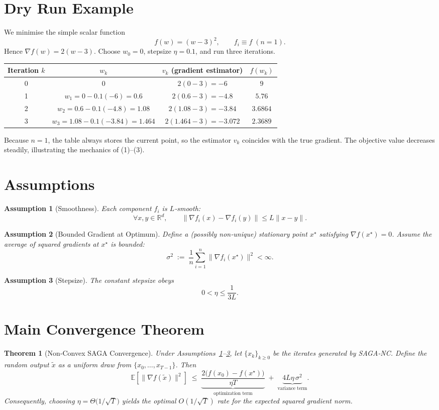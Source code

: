 \documentclass{article}
\newtheorem{theorem}{Theorem}
\newtheorem{assumption}{Assumption}
\newcommand{\E}{\mathbb{E}}
\newcommand{\R}{\mathbb{R}}
\begin{document}
\section*{Dry Run Example}
We minimise the simple scalar function 
\[
f(w)=(w-3)^2,\qquad f_i\equiv f\;(n=1).
\]
Hence $\nabla f(w)=2(w-3)$.  Choose $w_0=0$, stepsize $\eta=0.1$, and run three iterations.

\begin{center}
\begin{tabular}{c|c|c|c}
Iteration $k$ & $w_k$ & $v_k$ (gradient estimator) & $f(w_k)$\\\hline
0 & $0$ & $2(0-3)=-6$ & $9$\\
1 & $w_1=0-0.1(-6)=0.6$ & $2(0.6-3)=-4.8$ & $5.76$\\
2 & $w_2=0.6-0.1(-4.8)=1.08$ & $2(1.08-3)=-3.84$ & $3.6864$\\
3 & $w_3=1.08-0.1(-3.84)=1.464$ & $2(1.464-3)=-3.072$ & $2.3689$
\end{tabular}
\end{center}
Because $n=1$, the table always stores the current point, so the estimator $v_k$ coincides with the true gradient.  The objective value decreases steadily, illustrating the mechanics of (1)–(3).

\newpage
\section*{Assumptions}
\begin{assumption}[Smoothness]\label{as:smooth}
Each component $f_i$ is $L$‑smooth:
\[
\forall x,y\in\R^{d},\qquad 
\|\nabla f_i(x)-\nabla f_i(y)\|\le L\|x-y\|.
\]
\end{assumption}
\begin{assumption}[Bounded Gradient at Optimum]\label{as:bounded}
Define a (possibly non‑unique) stationary point $x^{\star}$ satisfying $\nabla f(x^{\star})=0$.  
Assume the average of squared gradients at $x^{\star}$ is bounded:
\[
\sigma^{2}\;:=\;\frac1n\sum_{i=1}^{n}\|\nabla f_i(x^{\star})\|^{2}<\infty .
\]
\end{assumption}
\begin{assumption}[Stepsize]\label{as:stepsize}
The constant stepsize obeys 
\[
0<\eta\le\frac{1}{3L}.
\]
\end{assumption}

\section*{Main Convergence Theorem}
\begin{theorem}[Non‑Convex SAGA Convergence]\label{thm:main}
Under Assumptions~\ref{as:smooth}–\ref{as:stepsize}, let $\{x_k\}_{k\ge0}$ be the iterates generated by SAGA‑NC.  
Define the random output $\tilde x$ as a uniform draw from $\{x_0,\dots,x_{T-1}\}$.  
Then
\[
\E\!\left[\bigl\|\nabla f(\tilde x)\bigr\|^{2}\right]
\;\le\;
\underbrace{\frac{2\bigl(f(x_0)-f(x^{\star})\bigr)}{\eta T}}_{\text{optimization term}}
\;+\;
\underbrace{4L\eta\,\sigma^{2}}_{\text{variance term}}.
\tag{4}
\]
Consequently, choosing $\eta = \Theta\!\bigl(1/\sqrt{T}\bigr)$ yields the optimal $O(1/\sqrt{T})$ rate for the expected squared gradient norm.
\end{theorem}
\end{document}
